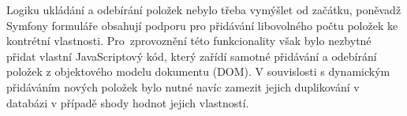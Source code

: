 Logiku ukládání a odebírání položek nebylo třeba vymýšlet od začátku, poněvadž Symfony formuláře obsahují podporu pro přidávání libovolného počtu položek ke kontrétní vlastnosti. Pro~zprovoznění této funkcionality však bylo nezbytné přidat vlastní JavaScriptový kód, který zařídí samotné přidávání a odebírání položek z objektového modelu dokumentu (DOM). V souvislosti s dynamickým přidáváním nových položek bylo nutné navíc zamezit jejich duplikování v databázi v případě shody hodnot jejich vlastností.
